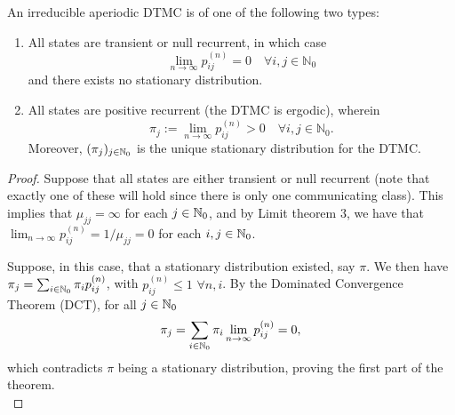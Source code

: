 \documentclass[a4paper,10pt]{article}
\begin{document}
\begin{thm}
  An irreducible aperiodic DTMC is of one of the following two types:
\begin{enumerate}
	\item All states are transient or null recurrent, in which case \[\lim_{n \to \infty} p_{ij}^{(n)} = 0 \quad \forall i,j \in \mathbb{N}_0\] and there exists no stationary distribution.
	\item All states are positive recurrent (the DTMC is ergodic), wherein
          \[ \pi_j := \lim_{n \to \infty} p_{ij}^{(n)} > 0 \quad
          \forall i,j \in \mathbb{N}_0.\]
          Moreover, $(\pi_j)_{j \in \mathbb{N}_0}$ is the unique stationary
          distribution for the DTMC.
\end{enumerate}
\end{thm}
\begin{proof}
  Suppose that all states are either transient or null recurrent (note
  that exactly one of these will hold since there is only one
  communicating class). This implies that $\mu_{jj} = \infty$ for each
  $j \in \mathbb{N}_0$, and by Limit theorem $3$, we have that
  $\lim_{n \to \infty} p_{ij}^{(n)} = 1/\mu_{jj} = 0$ for each
  $i,j \in \mathbb{N}_0$.  

  Suppose, in this case, that a stationary distribution existed, say
  $\pi$. We then have $\pi_j = \sum_{i \in \mathbb{N}_0}\pi_i p_{ij}^{(n)}$,
  with $p_{ij}^{(n)} \leq 1$ $\forall n, i$. By the Dominated
  Convergence Theorem (DCT), for all $j \in \mathbb{N}_0$
  \[ \pi_j =\sum_{i \in \mathbb{N}_0} \pi_i \lim_{n \to \infty} p_{ij}^{(n)} =
  0, \]
  which contradicts $\pi$ being a stationary distribution, proving the
  first part of the theorem.  \\


\end{proof}
\end{document}
